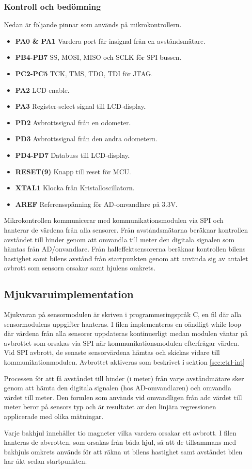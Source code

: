 \documentclass[tekniskrapport/tech.tex]{subfiles}
\begin{document}
\subsubsection{Kontroll och bedömning}
Nedan är följande pinnar som används på mikrokontrollern.
\begin{itemize}
   \item \textbf{PA0 \& PA1} Vardera port får insignal från en avståndsmätare.
   \item \textbf{PB4-PB7} SS, MOSI, MISO och SCLK för SPI-bussen.
   \item \textbf{PC2-PC5} TCK, TMS, TDO, TDI för JTAG.
   \item \textbf{PA2} LCD-enable.
   \item \textbf{PA3} Register-select signal till LCD-display.
   \item \textbf{PD2} Avbrottssignal från en odometer.
   \item \textbf{PD3} Avbrottssignal från den andra odometern.
   \item \textbf{PD4-PD7} Databuss till LCD-display.
   \item \textbf{RESET(9)} Knapp till reset för MCU.
   \item \textbf{XTAL1} Klocka från Kristalloscillatorn. 
   \item \textbf{AREF} Referensspänning för AD-omvandlare på 3.3V.

\end{itemize}
Mikrokontrollen kommunicerar med kommunikationsmodulen via SPI och hanterar de värdena från alla sensorer. Från avståndsmätarna beräknar kontrollen avståndet till hinder genom att omvandla till meter den digitala signalen som hämtas från AD/onvandlare. Från halleffektsensorerna beräknar kontrollen bilens hastighet samt bilens avstånd från startpunkten genom att använda sig av antalet avbrott som sensorn orsakar samt hjulens omkrets.

\subsection{Mjukvaruimplementation} 
Mjukvaran på sensormodulen är skriven i programmeringspråk C, en fil där alla sensormodulens uppgifter hanteras. I filen implementeras en oändligt while loop där värdena från alla sensorer uppdateras kontinuerligt medan modulen väntar på avbrottet som orsakas via SPI när kommunikationsmodulen efterfrågar värden. Vid SPI avbrott, de senaste sensorvärdena hämtas och skickas vidare till kommunikationmodulen. Avbrottet aktiveras
som beskrivet i sektion \ref{sec:ctrl-int}

Processen för att få avståndet till hinder (i meter) från varje avståndmätare sker genom att hämta den digitala signalen (hos AD-omvandlaren) och omvandla värdet till meter. Den formlen som används vid omvandligen från adc värdet till meter beror på sensors typ och är resultatet av den linjära regressionen applicerade med olika mätningar.
  
Varje bakhjul innehåller tio magneter vilka vardera orsakar ett avbrott. I filen hanteras de abvrotten, som orsakas från båda hjul, så att de tillsammans med bakhjuls omkrets används för att räkna ut bilens hastighet samt avståndet bilen har åkt sedan startpunkten.
\end{document}
